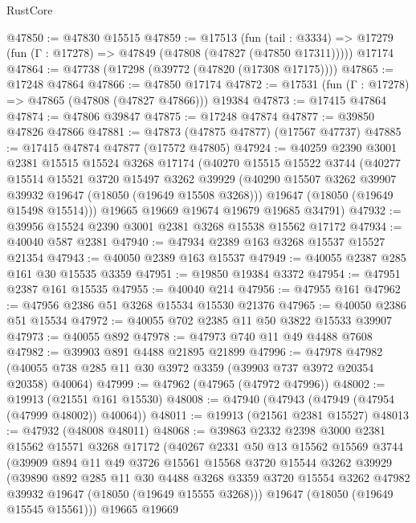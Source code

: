 \begin{lexlean}{RustCore}
\begin{coremodule}
@47850 := @47830 @15515
@47859 := @17513
    (fun (tail : @3334) => @17279 (fun (Γ : @17278) => @47849 (@47808 (@47827 (@47850 @17311)))))
    @17174
@47864 := @47738 (@17298 (@39772 (@47820 (@17308 @17175))))
@47865 := @17248 @47864
@47866 := @47850 @17174
@47872 := @17531 (fun (Γ : @17278) => @47865 (@47808 (@47827 @47866))) @19384
@47873 := @17415 @47864
@47874 := @47806 @39847
@47875 := @17248 @47874
@47877 := @39850 @47826 @47866
@47881 := @47873 (@47875 @47877) (@17567 @47737)
@47885 := @17415 @47874 @47877 (@17572 @47805)
@47924 := @40259
    @2390
    @3001
    @2381
    @15515
    @15524
    @3268
    @17174
    (@40270
      @15515
      @15522
      @3744
      (@40277
        @15514
        @15521
        @3720
        @15497
        @3262
        @39929
        (@40290 @15507 @3262 @39907 @39932 @19647 (@18050 (@19649 @15508 @3268)))
        @19647
        (@18050 (@19649 @15498 @15514)))
      @19665
      @19669
      @19674
      @19679
      @19685
      @34791)
@47932 := @39956 @15524 @2390 @3001 @2381 @3268 @15538 @15562 @17172
@47934 := @40040 @587 @2381
@47940 := @47934 @2389 @163 @3268 @15537 @15527 @21354
@47943 := @40050 @2389 @163 @15537
@47949 := @40055 @2387 @285 @161 @30 @15535 @3359
@47951 := @19850 @19384 @3372
@47954 := @47951 @2387 @161 @15535
@47955 := @40040 @214
@47956 := @47955 @161
@47962 := @47956 @2386 @51 @3268 @15534 @15530 @21376
@47965 := @40050 @2386 @51 @15534
@47972 := @40055 @702 @2385 @11 @50 @3822 @15533 @39907
@47973 := @40055 @892
@47978 := @47973 @740 @11 @49 @4488 @7608
@47982 := @39903 @891 @4488 @21895 @21899
@47996 := @47978
    @47982
    (@40055 @738 @285 @11 @30 @3972 @3359 (@39903 @737 @3972 @20354 @20358) @40064)
@47999 := @47962 (@47965 (@47972 @47996))
@48002 := @19913 (@21551 @161 @15530)
@48008 := @47940 (@47943 (@47949 (@47954 (@47999 @48002)) @40064))
@48011 := @19913 (@21561 @2381 @15527)
@48013 := @47932 (@48008 @48011)
@48068 := @39863
    @2332
    @2398
    @3000
    @2381
    @15562
    @15571
    @3268
    @17172
    (@40267
      @2331
      @50
      @13
      @15562
      @15569
      @3744
      (@39909
        @894
        @11
        @49
        @3726
        @15561
        @15568
        @3720
        @15544
        @3262
        @39929
        (@39890
          @892
          @285
          @11
          @30
          @4488
          @3268
          @3359
          @3720
          @15554
          @3262
          @47982
          @39932
          @19647
          (@18050 (@19649 @15555 @3268)))
        @19647
        (@18050 (@19649 @15545 @15561)))
      @19665
      @19669

\end{coremodule}
\end{lexlean}
